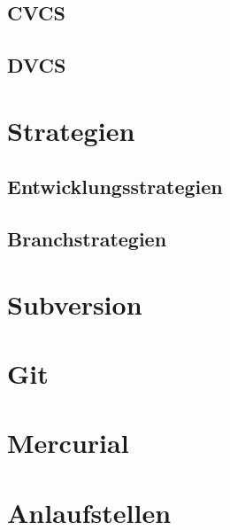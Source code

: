 \documentclass[presentation]{beamer}
\begin{document}
\subsection{CVCS}
\subsection{DVCS}

\section{Strategien}
\subsection{Entwicklungsstrategien}
\subsection{Branchstrategien}

\section{Subversion}
\section{Git}
\section{Mercurial}

\section{Anlaufstellen}
\end{document}
